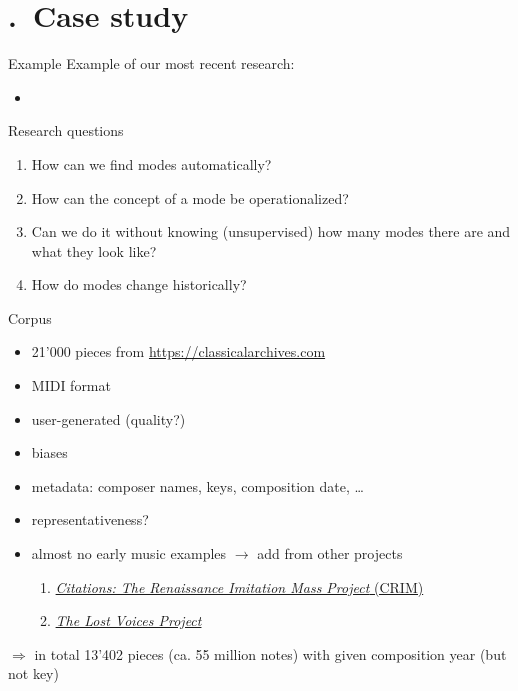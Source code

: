 \section{\thesection.~Case study}

\begin{frame}{Example}
    Example of our most recent research:
    \begin{itemize}
        \item {}
    \end{itemize}
\end{frame}

\begin{frame}{Research questions}
    \begin{enumerate}
        \item How can we find modes \alert{automatically}? 
        \item How can the concept of a \alert{mode} be operationalized? 
        \item Can we do it without knowing (\alert{unsupervised}) how many modes there are and what they look like?
        \item How do modes change \alert{historically}?
    \end{enumerate}
\end{frame}

\begin{frame}{Corpus}
    \begin{itemize}
        \item 21'000 pieces from \url{https://classicalarchives.com}
        \item MIDI format
        \item user-generated (quality?)
        \item biases
        \item metadata: composer names, keys, composition date, \ldots 
        \item representativeness?
        \item almost no early music examples $\longrightarrow$ add from other projects
        \begin{enumerate}
            \item \href{http://crimproject.org/}{\emph{Citations: The Renaissance Imitation Mass Project} (CRIM)}
            \item \href{http://digitalduchemin.org/}{\emph{The Lost Voices Project}}
        \end{enumerate}
    \end{itemize}
    \pause
    $\Longrightarrow$ in total 13'402 pieces (ca. 55 million notes) with given composition year (but not key)
\end{frame}

